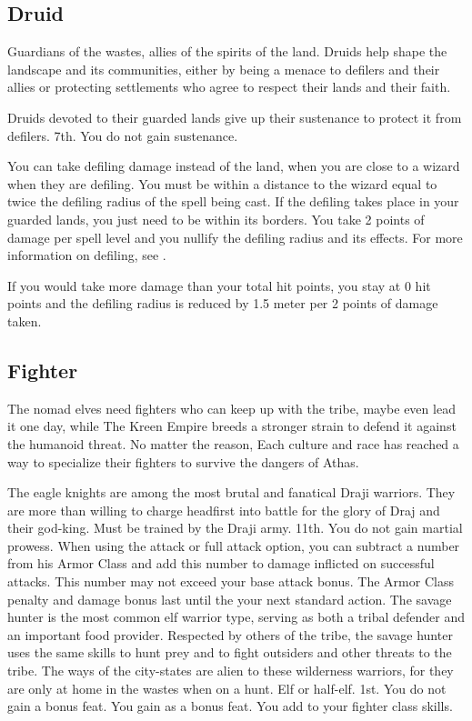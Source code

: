 \subsection{Druid}
Guardians of the wastes, allies of the spirits of the land. Druids help shape the landscape and its communities, either by being a menace to defilers and their allies or protecting settlements who agree to respect their lands and their faith.

{Druids devoted to their guarded lands give up their sustenance to protect it from defilers.}
{}
{7th.}
{You do not gain sustenance.}
{
	You can take defiling damage instead of the land, when you are close to a wizard when they are defiling. You must be within a distance to the wizard equal to twice the defiling radius of the spell being cast. If the defiling takes place in your guarded lands, you just need to be within its borders. You take 2 points of damage per spell level and you nullify the defiling radius and its effects. For more information on defiling, see .

	If you would take more damage than your total hit points, you stay at 0 hit points and the defiling radius is reduced by 1.5 meter per 2 points of damage taken.
}

\subsection{Fighter}
The nomad elves need fighters who can keep up with the tribe, maybe even lead it one day, while The Kreen Empire breeds a stronger strain to defend it against the humanoid threat. No matter the reason, Each culture and race has reached a way to specialize their fighters to survive the dangers of Athas.

{The eagle knights are among the most brutal and fanatical Draji warriors. They are more than willing to charge headfirst into battle for the glory of Draj and their god-king.}
{Must be trained by the Draji army.}
{11th.}
{You do not gain martial prowess.}
{
	When using the attack or full attack option, you can subtract a number from his Armor Class and add this number to damage inflicted on successful attacks. This number may not exceed your base attack bonus. The Armor Class penalty and damage bonus last until the your next standard action.
}
{The savage hunter is the most common elf warrior type, serving as both a tribal defender and an important food provider. Respected by others of the tribe, the savage hunter uses the same skills to hunt prey and to fight outsiders and other threats to the tribe. The ways of the city-states are alien to these wilderness warriors, for they are only at home in the wastes when on a hunt.}
{Elf or half-elf.}
{1st.}
{You do not gain a bonus feat.}
{
	You gain  as a bonus feat. You add  to your fighter class skills.
}

